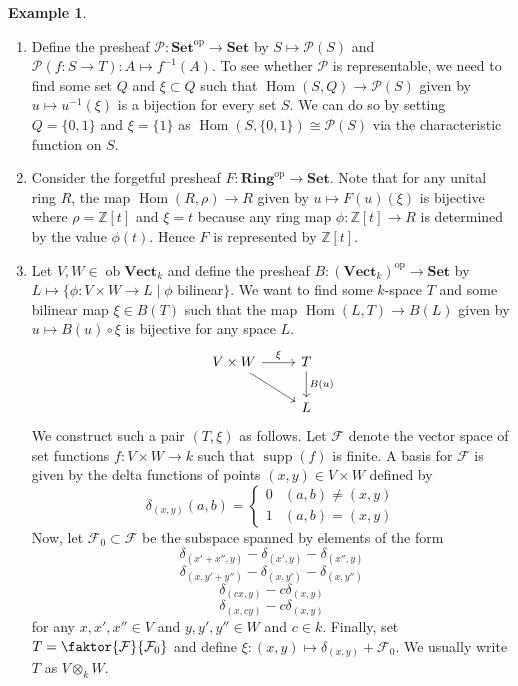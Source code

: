 \documentclass[10pt,letterpaper,cm]{nupset}
\theoremstyle{definition}
\newtheorem{exmp}{Example}
\renewcommand{\P}{\mathcal P}
\newcommand{\Z}{\mathbb Z}
\newcommand{\1}{\mathbf{1}}
\newcommand{\0}{\vec 0}
\DeclareMathOperator{\op}{op}
\DeclareMathOperator{\ob}{ob}
\DeclareMathOperator{\Hom}{Hom}
\DeclareMathOperator{\supp}{supp}
\begin{document}
\begin{exmp} $ $
\begin{enumerate}
\item Define the presheaf $\P : \mathbf{Set}^{\op} \to \mathbf{Set}$ by $S \mapsto \P(S)$ and $\P(f : S \to T) : A \mapsto f^{-1}(A).$ To see whether $\P$ is representable, we need to find some set $Q$ and $\xi \subset Q$ such that $\Hom(S, Q) \to \P(S)$ given by $u \mapsto u^{-1}(\xi)$ is a bijection for every set $S$. We can do so by setting $Q = \{0, 1\}$ and $\xi = \{1\}$ as $\Hom(S, \{0, 1\}) \cong \P(S)$ via the characteristic function on $S$.
\item Consider the forgetful presheaf $F: \mathbf{Ring}^{\op} \to \mathbf{Set}$. Note that for any unital ring $R$, the map $\Hom(R, \rho) \to R$ given by $u \mapsto F(u)(\xi)$ is bijective where $\rho = \Z[t]$ and $\xi = t$ because any ring map $\phi : \Z[t] \to R$ is determined by the value $\phi(t)$. Hence $F$ is represented by $\Z[t]$.
\item Let $V, W \in \ob \mathbf{Vect}_k$ and define the presheaf $B: (\mathbf{Vect}_k)^{\op} \to \mathbf{Set}$ by $L \mapsto \{ \phi : V \times W \to L \mid \phi$ bilinear$\}$. We want to find some $k$-space $T$ and some bilinear map $\xi \in B(T)$ such that the map $\Hom(L, T) \to B(L)$ given by $u \mapsto B(u) \circ \xi$ is bijective for any space $L$. 
\[
\begin{tikzcd}
V \times W \arrow[r, "\xi"] \arrow[rd] & T \arrow[d, "B(u)"] \\
 & L
\end{tikzcd}
\]
We construct such a pair $(T, \xi)$ as follows. Let $\mathcal{F}$ denote the vector space of set functions $f: V \times W \to k$ such that $\supp(f)$ is finite. A basis for $\mathcal{F}$ is given by the delta functions of points $(x, y) \in V \times W$ defined by
\[ \delta_{(x,y)}(a, b) = \begin{cases}
0 & (a,b) \ne (x,y) \\
1 & (a, b) = (x,y)
\end{cases}
\]
Now, let $\mathcal{F}_0 \subset \mathcal{F}$ be the subspace spanned by elements of the form
$$ \delta_{(x' + x'', y)} - \delta_{(x', y)} - \delta_{(x'', y)} $$
$$ \delta_{(x, y' + y'')} - \delta_{(x, y')} - \delta_{(x, y'')} $$
$$ \delta_{(cx, y)} - c\delta_{(x,y)}  $$
$$\delta_{(x,cy)} -c \delta_{(x,y)} $$
for any $x, x', x'' \in V$ and $y, y', y'' \in W$ and $c \in k$. Finally, set $T = \faktor{\mathcal{F}}{\mathcal{F}_0}$ and define $\xi : (x, y) \mapsto \delta_{(x,y)} + \mathcal{F}_0$. We usually write $T$ as $V \otimes_k W$.
\end{enumerate}
\end{exmp}
\end{document}

